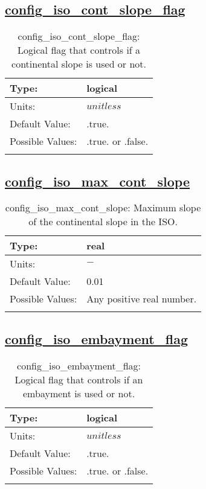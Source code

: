\subsection[config\_iso\_cont\_slope\_flag]{\hyperref[sec:nm_tab_iso]{config\_iso\_cont\_slope\_flag}}
\label{subsec:nm_sec_config_iso_cont_slope_flag}
\begin{center}
\begin{longtable}{| p{2.0in} || p{4.0in} |}
    \hline
    Type: & logical \\
    \hline
    Units: & $unitless$ \\
    \hline
    Default Value: & .true. \\
    \hline
    Possible Values: & .true. or .false. \\
    \hline
    \caption{config\_iso\_cont\_slope\_flag: Logical flag that controls if a continental slope is used or not.}
\end{longtable}
\end{center}
\subsection[config\_iso\_max\_cont\_slope]{\hyperref[sec:nm_tab_iso]{config\_iso\_max\_cont\_slope}}
\label{subsec:nm_sec_config_iso_max_cont_slope}
\begin{center}
\begin{longtable}{| p{2.0in} || p{4.0in} |}
    \hline
    Type: & real \\
    \hline
    Units: & $-$ \\
    \hline
    Default Value: & 0.01 \\
    \hline
    Possible Values: & Any positive real number. \\
    \hline
    \caption{config\_iso\_max\_cont\_slope: Maximum slope of the continental slope in the ISO.}
\end{longtable}
\end{center}
\subsection[config\_iso\_embayment\_flag]{\hyperref[sec:nm_tab_iso]{config\_iso\_embayment\_flag}}
\label{subsec:nm_sec_config_iso_embayment_flag}
\begin{center}
\begin{longtable}{| p{2.0in} || p{4.0in} |}
    \hline
    Type: & logical \\
    \hline
    Units: & $unitless$ \\
    \hline
    Default Value: & .true. \\
    \hline
    Possible Values: & .true. or .false. \\
    \hline
    \caption{config\_iso\_embayment\_flag: Logical flag that controls if an embayment is used or not.}
\end{longtable}
\end{center}
